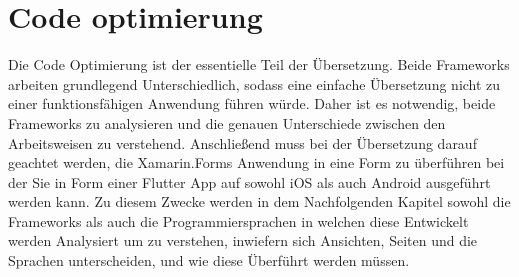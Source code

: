 \section{Code optimierung}
Die Code Optimierung ist der essentielle Teil der Übersetzung.  Beide Frameworks arbeiten grundlegend Unterschiedlich,  sodass eine einfache Übersetzung nicht zu einer funktionsfähigen Anwendung führen würde.  Daher ist es notwendig,  beide Frameworks zu analysieren und die genauen Unterschiede zwischen den Arbeitsweisen zu verstehend. Anschließend muss bei der Übersetzung darauf geachtet werden,  die Xamarin.Forms Anwendung in eine Form zu überführen bei der Sie in Form einer Flutter App auf sowohl iOS als auch Android ausgeführt werden kann.  Zu diesem Zwecke werden in dem Nachfolgenden Kapitel sowohl die Frameworks als auch die Programmiersprachen in welchen diese Entwickelt werden Analysiert um zu verstehen,  inwiefern sich Ansichten, Seiten und die Sprachen unterscheiden, und wie diese Überführt werden müssen. 